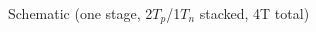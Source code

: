 \begin{center}
    Schematic (one stage, 2$T_{p}$/1$T_{n}$ stacked, 4T total)
    \begin{figure}[h] %
        \begin{center}
            \begin{circuitdiagram}{24}{22}
            \end{circuitdiagram}
        \end{center}
    \end{figure}
\end{center}
